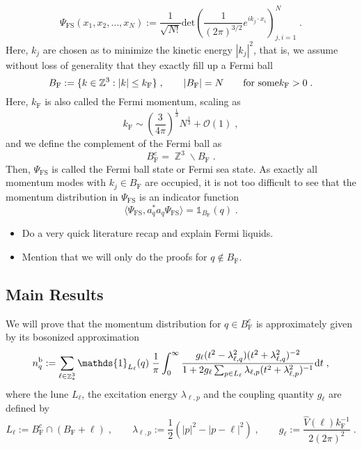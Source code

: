 \documentclass[12pt,a4paper]{article}
\numberwithin{equation}{section}
\newcommand{\ZZZ}{\mathbb{Z}}
\newcommand{\1}{\mathbb{I}}
\renewcommand{\b}{\textnormal{b}}
\newcommand{\F}{\mathrm{F}}
\newcommand{\FS}{\mathrm{FS}}
\DeclareMathOperator{\Z}{\mathbb{Z}}
\newcommand{\half}{\frac{1}{2}}
\theoremstyle{plain}
\theoremstyle{definition}
\theoremstyle{remark}
\theoremstyle{plain}
\theoremstyle{definition}
\theoremstyle{remark}
\begin{document}
\begin{equation}
    \Psi_{\FS}(x_1, x_2, \ldots, x_N) := \frac{1}{\sqrt{N!}}\text{det}\left(\frac{1}{(2\pi)^{3/2}}e^{ik_j\cdot x_i}\right)^N_{j,i=1} \;.
\end{equation}
Here, $ k_j $ are chosen as to minimize the kinetic energy $ |k_j|^2 $, that is, we assume without loss of generality that they exactly fill up a Fermi ball
\begin{equation}
	B_{\F} := \{ k \in \ZZZ^3 : |k| \le k_{\F} \} \;, \qquad
	|B_{\F}| = N \qquad \textnormal{for some} k_{\F} > 0 \;.
\end{equation}
Here, $ k_{\F} $ is also called the Fermi momentum, scaling as
\begin{equation}
    k_{\F} \sim \left(\frac{3}{4\pi}\right)^\frac{1}{3}N^\frac{1}{3} + \mathcal{O}(1) \;,
\end{equation}
and we define the complement of the Fermi ball as 
\begin{equation}
    B_{\F}^c=\Z^3\backslash B_{\F} \;.
\end{equation}
Then, $ \Psi_{\FS} $ is called the Fermi ball state or Fermi sea state. As exactly all momentum modes with $ k_j \in B_{\F} $ are occupied, it is not too difficult to see that the momentum distribution in $ \Psi_{\FS} $ is an indicator function
\begin{equation}
	\langle \Psi_{\FS}, a_q^* a_q \Psi_{\FS} \rangle
	= \mathds{1}_{B_{\F}}(q) \;.
\end{equation}


\begin{itemize}
\item Do a very quick literature recap and explain Fermi liquids.
\item Mention that we will only do the proofs for $ q \notin B_{\F} $.
\end{itemize}




\subsection{Main Results}
\label{subsec:mainresult}


We will prove that the momentum distribution for $ q \in B_{\F}^c $ is approximately given by its bosonized approximation
\begin{equation} \label{eq:nqb}
	n_q^{\b}
	:= \sum\limits_{\ell \in \Z^3_*}\mathds{1}_{L_{\ell}}(q) \; \frac{1}{\pi}\int_0^\infty \frac{g_\ell (t^2-\lambda^2_{\ell,q}) (t^2 + \lambda^2_{\ell,q})^{-2}}{1 + 2g_\ell \sum_{p \in L_{\ell}}\lambda_{\ell,p} (t^2+\lambda^2_{\ell,p})^{-1}} \mathrm{d}t \;,
\end{equation}
where the lune $ L_\ell $, the excitation energy $ \lambda_{\ell,p} $ and the coupling quantity $ g_\ell $ are defined by
\begin{equation}
	L_\ell := B_{\F}^c \cap (B_{\F} + \ell) \;, \qquad
	\lambda_{\ell,p} := \half (|p|^2 - |p-\ell|^2) \;, \qquad
	g_\ell := \frac{\hat{V}(\ell) k_{\F}^{-1}}{2 (2 \pi)^2} \;.
\end{equation}
\end{document}
